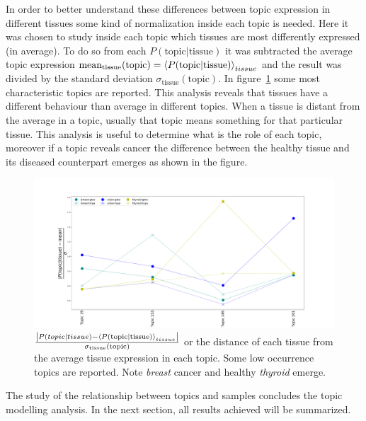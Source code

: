 In order to better understand these differences between topic expression in different tissues some kind of normalization inside each topic is needed. Here it was chosen to study inside each topic which tissues are most differently expressed (in average). To do so from each $P(\text{topic}| \text{tissue})$ it was subtracted the average topic expression $\text{mean}_{\text{tissue}}(\text{topic})=\left\langle P(\text{topic}| \text{tissue})\right\rangle_{tissue}$ and the result was divided by the standard deviation $\sigma_{\text{tissue}}(\text{topic})$. In figure~\ref{fig:topic/merged/lifeplot_normalised_level3_hd} some most characteristic topics are reported. This analysis reveals that tissues have a different behaviour than average in different topics. When a tissue is distant from the average in a topic, usually that topic means something for that particular tissue. This analysis is useful to determine what is the role of each topic, moreover if a topic reveals cancer the difference between the healthy tissue and its diseased counterpart emerges as shown in the figure.
\begin{figure}[htb!]
	\centering
	\includegraphics[width=0.85\linewidth]{pictures/topic/merged/lifeplot_normalised_level3_hd.pdf}
	\caption{$\frac{\left|P(topic | tissue) - \left\langle P(\text{topic}| \text{tissue})\right\rangle_{tissue}\right|}{\sigma_{\text{tissue}}(\text{topic})}$ or the distance of each tissue from the average tissue expression in each topic. Some low occurrence topics are reported. Note \textit{breast} cancer and healthy \textit{thyroid} emerge.}
	\label{fig:topic/merged/lifeplot_normalised_level3_hd}
\end{figure}

The study of the relationship between topics and samples concludes the topic modelling analysis. In the next section, all results achieved will be summarized.